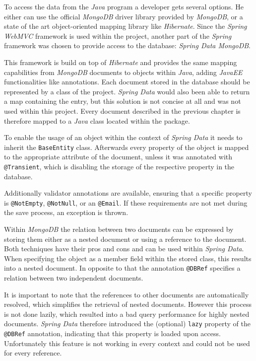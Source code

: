 To access the data from the \emph{Java} program a developer gets several options. He either can use the official \emph{MongoDB} driver library provided by \emph{MongoDB}, or a state of the art object-oriented mapping library like \emph{Hibernate}. Since the \emph{Spring WebMVC} framework is used within the project, another part of the \emph{Spring} framework was chosen to provide access to the database: \emph{Spring Data MongoDB}.

This framework is build on top of \emph{Hibernate} and provides the same mapping capabilities from \emph{MongoDB} documents to objects within \emph{Java}, adding \emph{JavaEE} functionalities like annotations. Each document stored in the database should be represented by a class of the project. \emph{Spring Data} would also been able to return a map containing the entry, but this solution is not concise at all and was not used within this project. Every document described in the previous chapter is therefore mapped to a \emph{Java} class located within the  package. 

To enable the usage of an object within the context of \emph{Spring Data} it needs to inherit the \texttt{BaseEntity} class. Afterwards every property of the object is mapped to the appropriate attribute of the document, unless it was annotated with \texttt{@Transient}, which is disabling the storage of the respective property in the database. 

Additionally validator annotations are available, ensuring that a specific property is \texttt{@NotEmpty}, \texttt{@NotNull}, or an \texttt{@Email}. If these requirements are not met during the save process, an exception is thrown. 

Within \emph{MongoDB} the relation between two documents can be expressed by storing them either as a nested document or using a reference to the document. Both techniques have their pros and cons and can be used within \emph{Spring Data}. When specifying the object as a member field within the stored class, this results into a nested document. In opposite to that the annotation \texttt{@DBRef} specifies a relation between two independent documents.

It is important to note that the references to other documents are automatically resolved, which simplifies the retrieval of nested documents. However this process is not done lazily, which resulted into a bad query performance for highly nested documents. \emph{Spring Data} therefore introduced the (optional) \texttt{lazy} property of the \texttt{@DBRef} annotation, indicating that this property is loaded upon access. Unfortunately this feature is not working in every context and could not be used for every reference.

